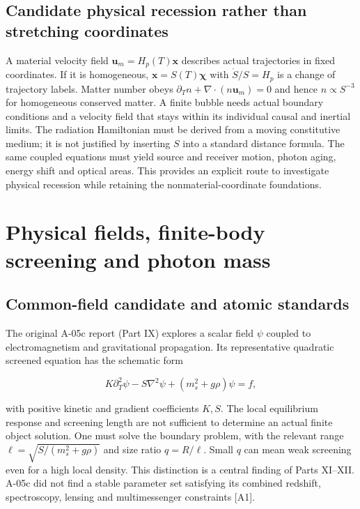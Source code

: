 \documentclass[
  11pt,
  twoside]{article}
\begin{document}
\subsection{Candidate physical recession rather than stretching
coordinates}\label{candidate-physical-recession-rather-than-stretching-coordinates}

A material velocity field \(\mathbf u_m=H_p(T)\mathbf x\) describes
actual trajectories in fixed coordinates. If it is homogeneous,
\(\mathbf x=S(T)\boldsymbol\chi\) with \(\dot S/S=H_p\) is a change of
trajectory labels. Matter number obeys
\(\partial_T n+\nabla\cdot(n\mathbf u_m)=0\) and hence
\(n\propto S^{-3}\) for homogeneous conserved matter. A finite bubble
needs actual boundary conditions and a velocity field that stays within
its individual causal and inertial limits. The radiation Hamiltonian
must be derived from a moving constitutive medium; it is not justified
by inserting \(S\) into a standard distance formula. The same coupled
equations must yield source and receiver motion, photon aging, energy
shift and optical areas. This provides an explicit route to investigate
physical recession while retaining the nonmaterial-coordinate
foundations.

\section{Physical fields, finite-body screening and photon
mass}\label{physical-fields-finite-body-screening-and-photon-mass}

\subsection{Common-field candidate and atomic
standards}\label{common-field-candidate-and-atomic-standards}

The original A-05c report (Part IX) explores a scalar field \(\psi\)
coupled to electromagnetism and gravitational propagation. Its
representative quadratic screened equation has the schematic form

\[K\partial_T^2\psi-S\nabla^2\psi+(m_s^2+g\rho)\psi=f,\]

with positive kinetic and gradient coefficients \(K,S\). The local
equilibrium response and screening length are not sufficient to
determine an actual finite object solution. One must solve the boundary
problem, with the relevant range \(\ell=\sqrt{S/(m_s^2+g\rho)}\) and
size ratio \(q=R/\ell\). Small \(q\) can mean weak screening even for a
high local density. This distinction is a central finding of Parts
XI--XII. A-05c did not find a stable parameter set satisfying its
combined redshift, spectroscopy, lensing and multimessenger constraints
{[}A1{]}.
\end{document}
